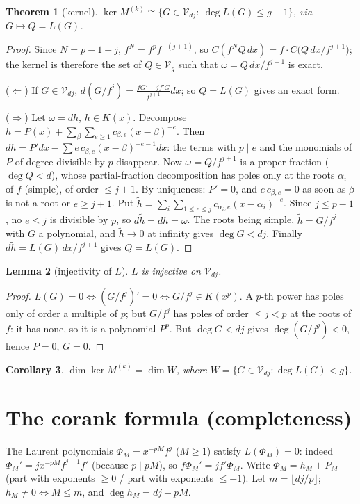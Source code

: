 \documentclass[11pt,a4paper]{article}
\newtheorem{thm}{Theorem}
\newtheorem{lem}[thm]{Lemma}
\newtheorem{cor}[thm]{Corollary}
\theoremstyle{remark}\newtheorem*{rem}{Remark}
\newcommand{\V}{\mathcal V}
\begin{document}
\begin{thm}[kernel]\label{t1} $\ker M^{(k)}\cong\{G\in\V_{dj}:\ \deg L(G)\le g-1\}$, via $G\mapsto Q=L(G)$.\end{thm}
\begin{proof}
Since $N=p-1-j$, $f^N=f^p f^{-(j+1)}$, so $C(f^NQ\,dx)=f\cdot C\big(Q\,dx/f^{j+1}\big)$; the kernel is therefore the set of $Q\in\V_g$ such that $\omega=Q\,dx/f^{j+1}$ is exact.

($\Leftarrow$) If $G\in\V_{dj}$, $d(G/f^j)=\frac{fG'-jf'G}{f^{j+1}}dx$; so $Q=L(G)$ gives an exact form.

($\Rightarrow$) Let $\omega=dh$, $h\in K(x)$. Decompose $h=P(x)+\sum_{\beta}\sum_{e\ge1}c_{\beta,e}(x-\beta)^{-e}$. Then $dh=P'dx-\sum e\,c_{\beta,e}(x-\beta)^{-e-1}dx$: the terms with $p\mid e$ and the monomials of $P$ of degree divisible by $p$ disappear. Now $\omega=Q/f^{j+1}$ is a proper fraction ($\deg Q<d$), whose partial-fraction decomposition has poles only at the roots $\alpha_i$ of $f$ (simple), of order $\le j+1$. By uniqueness: $P'=0$, and $e\,c_{\beta,e}=0$ as soon as $\beta$ is not a root or $e\ge j+1$. Put $\tilde h=\sum_i\sum_{1\le e\le j}c_{\alpha_i,e}(x-\alpha_i)^{-e}$. Since $j\le p-1$, no $e\le j$ is divisible by $p$, so $d\tilde h=dh=\omega$. The roots being simple, $\tilde h=G/f^j$ with $G$ a polynomial, and $\tilde h\to0$ at infinity gives $\deg G<dj$. Finally $d\tilde h=L(G)\,dx/f^{j+1}$ gives $Q=L(G)$.\end{proof}

\begin{lem}[injectivity of $L$]\label{l2} $L$ is injective on $\V_{dj}$.\end{lem}
\begin{proof} $L(G)=0\iff(G/f^j)'=0\iff G/f^j\in K(x^p)$. A $p$-th power has poles only of order a multiple of $p$; but $G/f^j$ has poles of order $\le j<p$ at the roots of $f$: it has none, so it is a polynomial $P^p$. But $\deg G<dj$ gives $\deg(G/f^j)<0$, hence $P=0$, $G=0$.\end{proof}

\begin{cor}\label{c3} $\dim\ker M^{(k)}=\dim W$, where $W=\{G\in\V_{dj}:\deg L(G)<g\}$.\end{cor}

\section{The corank formula (completeness)}

The Laurent polynomials $\Phi_M=x^{-pM}f^j$ ($M\ge1$) satisfy $L(\Phi_M)=0$: indeed $\Phi_M'=jx^{-pM}f^{j-1}f'$ (because $p\mid pM$), so $f\Phi_M'=jf'\Phi_M$. Write $\Phi_M=h_M+P_M$ (part with exponents $\ge0$ / part with exponents $\le-1$). Let $m=\lfloor dj/p\rfloor$; $h_M\ne0\iff M\le m$, and $\deg h_M=dj-pM$.
\end{document}
